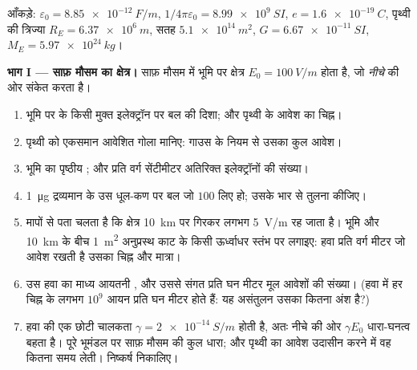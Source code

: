 \begin{problem}[{सप्ताहांत समस्या --- साफ़ मौसम का क्षेत्र, तड़ित-मेघ,
बिजली का आघात, और गुरुत्व पर घुमाया गया गाउस का नियम}]
\label{pb:b1:electrostatics-gauss:1}
आँकड़े: $\varepsilon_0 = \qty{8.85e-12}{F/m}$, $1/4\pi\varepsilon_0 = \qty{8.99e9}{SI}$,
$e = \qty{1.6e-19}{C}$, पृथ्वी की त्रिज्या $R_E = \qty{6.37e6}{m}$, सतह
$\qty{5.1e14}{m^2}$, $G = \qty{6.67e-11}{SI}$, $M_E = \qty{5.97e24}{kg}$।

\medskip
\noindent\textbf{भाग I --- साफ़ मौसम का क्षेत्र।}
साफ़ मौसम में भूमि पर क्षेत्र $E_0 = \qty{100}{V/m}$ होता है, जो
\emph{नीचे} की ओर संकेत करता है।
\begin{enumerate}
  \item भूमि पर के किसी मुक्त इलेक्ट्रॉन पर बल की दिशा; और पृथ्वी के
        आवेश का चिह्न।
  \item पृथ्वी को एकसमान आवेशित गोला मानिए: गाउस के नियम से उसका कुल
        आवेश।
  \item भूमि का पृष्ठीय ; और प्रति वर्ग सेंटीमीटर अतिरिक्त
        इलेक्ट्रॉनों की संख्या।
  \item \qty{1}{\micro g} द्रव्यमान के उस धूल-कण पर बल जो $100$ 
        लिए हो; उसके भार से तुलना कीजिए।
  \item मापों से पता चलता है कि क्षेत्र \qty{10}{km} पर गिरकर लगभग
        \qty{5}{V/m} रह जाता है। भूमि और \qty{10}{km} के बीच
        \qty{1}{m^2} अनुप्रस्थ काट के किसी ऊर्ध्वाधर स्तंभ पर 
        लगाइए: हवा प्रति वर्ग मीटर जो आवेश रखती है उसका चिह्न और मात्रा।
  \item उस हवा का माध्य आयतनी , और उससे संगत प्रति घन मीटर मूल
        आवेशों की संख्या। (हवा में हर चिह्न के लगभग $10^9$ आयन प्रति घन
        मीटर होते हैं: यह असंतुलन उसका कितना अंश है?)
  \item हवा की एक छोटी चालकता $\gamma = \qty{2e-14}{S/m}$ होती है, अतः
        नीचे की ओर $\gamma E_0$ धारा-घनत्व बहता है। पूरे भूमंडल पर साफ़
        मौसम की कुल धारा; और पृथ्वी का आवेश उदासीन करने में वह कितना समय
        लेती। निष्कर्ष निकालिए।
\end{enumerate}


\end{problem}
